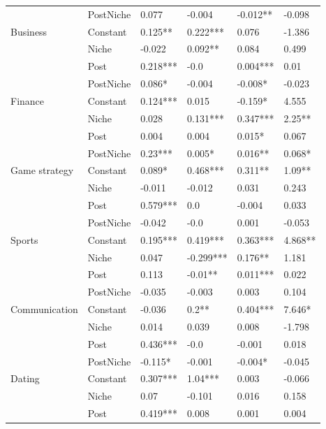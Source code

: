 \begin{table}[h!]
\begin{tabular}{llllll}
          & PostNiche &  0.077 &  -0.004 &  -0.012** &  -0.098 \\
\cline{1-6}
\multirow{4}{*}{Business} & Constant &  0.125** &  0.222*** &  0.076 &  -1.386 \\
          & Niche &  -0.022 &  0.092** &  0.084 &  0.499 \\
          & Post &  0.218*** &  -0.0 &  0.004*** &  0.01 \\
          & PostNiche &  0.086* &  -0.004 &  -0.008* &  -0.023 \\
\cline{1-6}
\multirow{4}{*}{Finance} & Constant &  0.124*** &  0.015 &  -0.159* &  4.555 \\
          & Niche &  0.028 &  0.131*** &  0.347*** &  2.25** \\
          & Post &  0.004 &  0.004 &  0.015* &  0.067 \\
          & PostNiche &  0.23*** &  0.005* &  0.016** &  0.068* \\
\cline{1-6}
\multirow{4}{*}{Game strategy} & Constant &  0.089* &  0.468*** &  0.311** &  1.09** \\
          & Niche &  -0.011 &  -0.012 &  0.031 &  0.243 \\
          & Post &  0.579*** &  0.0 &  -0.004 &  0.033 \\
          & PostNiche &  -0.042 &  -0.0 &  0.001 &  -0.053 \\
\cline{1-6}
\multirow{4}{*}{Sports} & Constant &  0.195*** &  0.419*** &  0.363*** &  4.868** \\
          & Niche &  0.047 &  -0.299*** &  0.176** &  1.181 \\
          & Post &  0.113 &  -0.01** &  0.011*** &  0.022 \\
          & PostNiche &  -0.035 &  -0.003 &  0.003 &  0.104 \\
\cline{1-6}
\multirow{4}{*}{Communication} & Constant &  -0.036 &  0.2** &  0.404*** &  7.646* \\
          & Niche &  0.014 &  0.039 &  0.008 &  -1.798 \\
          & Post &  0.436*** &  -0.0 &  -0.001 &  0.018 \\
          & PostNiche &  -0.115* &  -0.001 &  -0.004* &  -0.045 \\
\cline{1-6}
\multirow{4}{*}{Dating} & Constant &  0.307*** &  1.04*** &  0.003 &  -0.066 \\
          & Niche &  0.07 &  -0.101 &  0.016 &  0.158 \\
          & Post &  0.419*** &  0.008 &  0.001 &  0.004 \\

\end{tabular}
\end{table}
